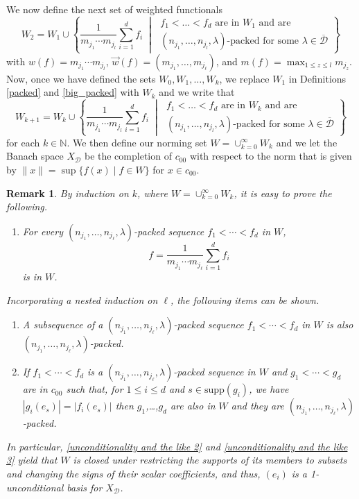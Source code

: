 \documentclass[12pt,a4paper]{amsart}
\newcommand{\N}{\mathbb{N}}
\newcommand{\bes}{\begin{equation*}}
\newcommand{\ees}{\end{equation*}}
\theoremstyle{definition}
\theoremstyle{plain}
\newtheorem{remark}[question]{Remark}
\begin{document}
We now define the next set of weighted functionals
\bes W_{2}=W_{1}\cup\left\{ \frac{1}{m_{j_{1}}\cdots m_{j_{l}}}\sum_{i=1}^{d}f_{i} \;\middle\vert\; \substack{ f_{1}<\ldots<f_{d} \text{ are in } W_{1} \text{ and are} \\  (n_{j_{1}},\ldots,n_{j_{l}},\lambda)\text{-packed for some } \lambda\in\overline{\mathcal{D}}} \right\} \ees
with $w(f)=m_{j_{1}}\cdots m_{j_{l}}$, $\vec w(f) = (m_{j_1},\ldots, m_{j_\ell})$, and $m(f)=\max_{1\leq z\leq l}m_{j_{z}}$. Now, once we have defined the sets $W_{0},W_{1},\ldots,W_{k}$, we replace $W_{1}$ in Definitions \ref{packed} and \ref{big_packed} with $W_{k}$ and we write that
\bes W_{k+1}=W_{k}\cup\left\{ \frac{1}{m_{j_{1}}\cdots m_{j_{l}}}\sum_{i=1}^{d}f_{i} \;\middle\vert\; \substack{ f_{1}<\ldots<f_{d} \text{ are in } W_{k} \text{ and are} \\  (n_{j_{1}},\ldots,n_{j_{l}},\lambda)\text{-packed for some } \lambda\in\overline{\mathcal{D}}} \right\} \ees
for each $k\in\N$. We then define our norming set $W=\cup_{k=0}^{\infty}W_{k}$ and we let the Banach space $X_\mathcal{D}$ be the completion of $c_{00}$ with respect to the norm that is given by $\|x\|=\sup\{f(x) \mid f\in W\}$ for $x\in c_{00}$.


\begin{remark}
\label{unconditionality and the like}
By induction on $k$, where $W = \cup_{k=0}^\infty W_k$, it is easy to prove the following.
\begin{enumerate}[label=(\arabic*)]
    \item\label{unconditionality and the like 1} For every $(n_{j_1},\ldots,n_{j_\ell},\lambda)$-packed sequence $f_1<\cdots<f_d$ in $W$,
    \[f = \frac{1}{m_{j_1}\cdots m_{j_\ell}}\sum_{i=1}^df_i\]
    is in $W$.
    \end{enumerate}
Incorporating a nested induction on $\ell$, the following items can be shown.
    \begin{enumerate}[resume,label=(\arabic*)]

    \item\label{unconditionality and the like 2}  A subsequence of a $(n_{j_1},\ldots,n_{j_\ell},\lambda)$-packed sequence $f_1<\cdots<f_d$ in $W$ is also $(n_{j_1},\ldots,n_{j_\ell},\lambda)$-packed.

    \item\label{unconditionality and the like 3} If $f_1<\cdots<f_d$ is a $(n_{j_1},\ldots,n_{j_\ell},\lambda)$-packed sequence in $W$ and $g_1<\cdots<g_d$ are in $c_{00}$ such that, for $1\leq i\leq d$ and $s\in\mathrm{supp}(g_i)$, we have $|g_i(e_s)| = |f_i(e_s)|$ then $g_1$,\ldots,$g_d$ are also in $W$ and they are $(n_{j_1},\ldots,n_{j_\ell},\lambda)$-{packed}.

\end{enumerate}
In particular, \ref{unconditionality and the like 2} and \ref{unconditionality and the like 3} yield that $W$ is closed under restricting the supports of its members to subsets and changing the signs of their scalar coefficients, and thus, $(e_i)$ is a 1-unconditional basis for $X_\mathcal{D}$.
\end{remark}
\end{document}
